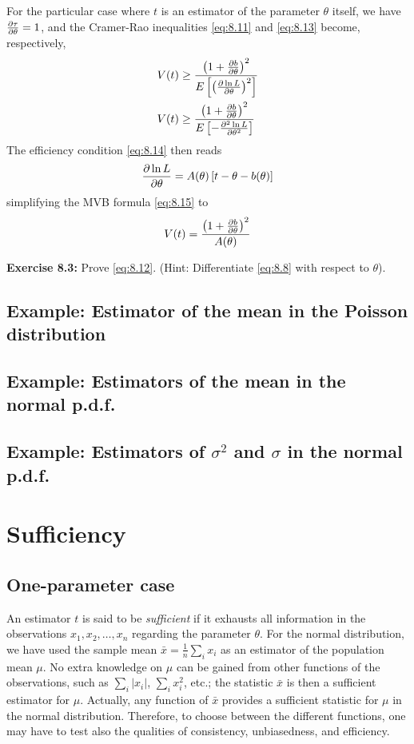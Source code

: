 \documentclass[../main.tex]{subfiles}
\begin{document}
For the particular case where $t$ is an estimator of the parameter $\theta$ itself,
we have $\frac{\partial \tau}{\partial \theta} = 1$,
and the Cramer-Rao inequalities \eqref{eq:8.11} and \eqref{eq:8.13} become, respectively,
%
\begin{align}
    V(t)
    &\geq \frac
    {\left( 1 + \frac{\partial b}{\partial \theta} \right)^2}
    {E\left[\left(\frac{\partial \ln L}{\partial \theta}\right)^2\right]}
    \label{eq:8.17}
    \\
    V(t)
    &\geq \frac
    {\left( 1 + \frac{\partial b}{\partial \theta} \right)^2}
    {E\left[-\frac{\partial^2 \ln L}{\partial \theta^2}\right]}
    \label{eq:8.18}
\end{align}
%
The efficiency condition \eqref{eq:8.14} then reads
%
\begin{equation}
    \frac{\partial \ln L}{\partial \theta} = A(\theta) \left[ t - \theta - b(\theta) \right]
    \label{eq:8.19}
\end{equation}
%
simplifying the MVB formula \eqref{eq:8.15} to
%
\begin{equation}
    V(t) = \frac
    {\left( 1 + \frac{\partial b}{\partial \theta} \right)^2}
    {A(\theta)}
    \label{eq:8.20}
\end{equation}
%

\textbf{Exercise 8.3:}
Prove \eqref{eq:8.12}.
(Hint: Differentiate \eqref{eq:8.8} with respect to $\theta$).

\subsection{Example: Estimator of the mean in the Poisson distribution}
\subsection{Example: Estimators of the mean in the normal p.d.f.}
\subsection{Example: Estimators of $\sigma^2$ and $\sigma$ in the normal p.d.f.}

\section{Sufficiency}

\subsection{One-parameter case}

An estimator $t$ is said to be \emph{sufficient}
if it exhausts all information in the observations $x_1, x_2, \ldots, x_n$ regarding the parameter $\theta$.
For the normal distribution,
we have used the sample mean $\bar{x} = \frac{1}{n} \sum_i x_i$
as an estimator of the population mean $\mu$.
No extra knowledge on $\mu$ can be gained from other functions of the observations,
such as $\sum_i |x_i|$, $\sum_i x_i^2$, etc.;
the statistic $\bar{x}$ is then a sufficient estimator for $\mu$.
Actually, any function of $\bar{x}$ provides a sufficient statistic for $\mu$ in the normal distribution.
Therefore,
to choose between the different functions,
one may have to test also the qualities of consistency, unbiasedness, and efficiency.
\end{document}

